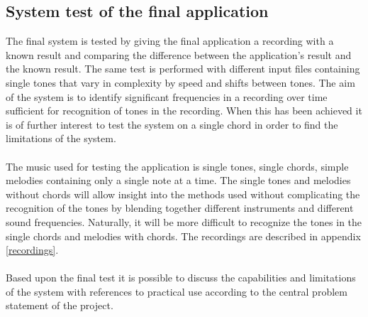 \subsection{System test of the final application}\label{sec:final_test3}
The final system is tested by giving the final application a recording with a known result and comparing the difference between the application's result and the known result. The same test is performed with different input files containing single tones that vary in complexity by speed and shifts between tones. The aim of the system is to identify significant frequencies in a recording over time sufficient for recognition of tones in the recording. When this has been achieved it is of further interest to test the system on a single chord in order to find the limitations of the system.
\\\\
The music used for testing the application is single tones, single chords, simple melodies containing only a single note at a time. The single tones and melodies without chords will allow insight into the methods used without complicating the recognition of the tones by blending together different instruments and different sound frequencies. Naturally, it will be more difficult to recognize the tones in the single chords and melodies with chords. The recordings are described in appendix \ref{recordings}. \\
\\
Based upon the final test it is possible to discuss the capabilities and limitations of the system with references to practical use according to the central problem statement of the project.  